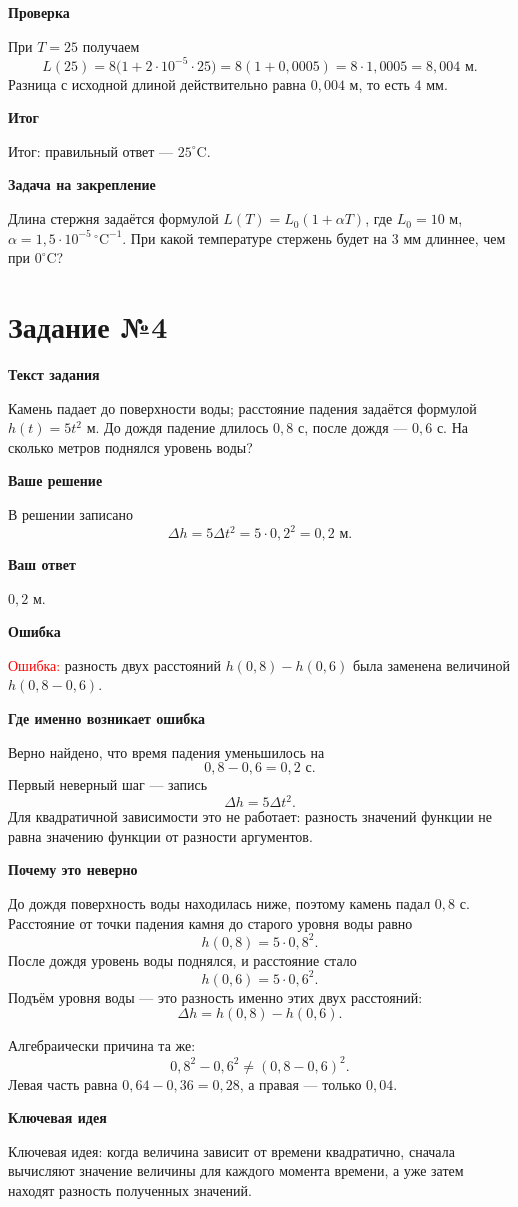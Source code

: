\documentclass[12pt,a4paper]{article}
\newcommand{\tasktitle}[1]{\section*{Задание №#1}}
\newcommand{\subhead}[1]{\par\medskip\textbf{#1}\par\smallskip}
\begin{document}
\subhead{Проверка}
При $T=25$ получаем
\[
L(25)=8\bigl(1+2\cdot10^{-5}\cdot25\bigr)
=8(1+0{,}0005)=8\cdot1{,}0005=8{,}004\text{ м}.
\]
Разница с исходной длиной действительно равна $0{,}004$ м, то есть $4$ мм.

\subhead{Итог}
\textcolor{teal!60!black}{Итог:} правильный ответ --- $25^{\circ}\mathrm{C}$.

\subhead{Задача на закрепление}
Длина стержня задаётся формулой $L(T)=L_0(1+\alpha T)$, где $L_0=10$ м, $\alpha=1{,}5\cdot10^{-5}\,^{\circ}\mathrm{C}^{-1}$. При какой температуре стержень будет на $3$ мм длиннее, чем при $0^{\circ}\mathrm{C}$?

\newpage
{}\label{task:4}
\tasktitle{4}

\subhead{Текст задания}
Камень падает до поверхности воды; расстояние падения задаётся формулой $h(t)=5t^2$ м. До дождя падение длилось $0{,}8$ с, после дождя --- $0{,}6$ с. На сколько метров поднялся уровень воды?

\subhead{Ваше решение}
В решении записано
\[
\Delta h=5\Delta t^2=5\cdot0{,}2^2=0{,}2\text{ м}.
\]

\subhead{Ваш ответ}
$0{,}2$ м.

\subhead{Ошибка}
\textcolor{red}{Ошибка:} разность двух расстояний $h(0{,}8)-h(0{,}6)$ была заменена величиной $h(0{,}8-0{,}6)$.

\subhead{Где именно возникает ошибка}
Верно найдено, что время падения уменьшилось на
\[
0{,}8-0{,}6=0{,}2\text{ с}.
\]
Первый неверный шаг --- запись
\[
\Delta h=5\Delta t^2.
\]
Для квадратичной зависимости это не работает: разность значений функции не равна значению функции от разности аргументов.

\subhead{Почему это неверно}
До дождя поверхность воды находилась ниже, поэтому камень падал $0{,}8$ с. Расстояние от точки падения камня до старого уровня воды равно
\[
h(0{,}8)=5\cdot0{,}8^2.
\]
После дождя уровень воды поднялся, и расстояние стало
\[
h(0{,}6)=5\cdot0{,}6^2.
\]
Подъём уровня воды --- это разность именно этих двух расстояний:
\[
\Delta h=h(0{,}8)-h(0{,}6).
\]

Алгебраически причина та же:
\[
0{,}8^2-0{,}6^2\ne(0{,}8-0{,}6)^2.
\]
Левая часть равна $0{,}64-0{,}36=0{,}28$, а правая --- только $0{,}04$.

\subhead{Ключевая идея}
\textcolor{blue!60!black}{Ключевая идея:} когда величина зависит от времени квадратично, сначала вычисляют значение величины для каждого момента времени, а уже затем находят разность полученных значений.
\end{document}
